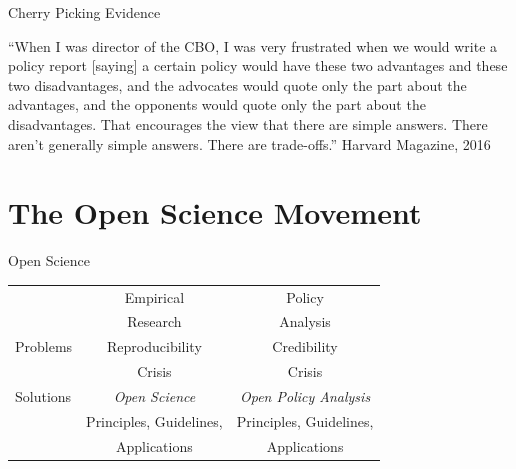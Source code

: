 \documentclass{beamer}
\def\white{\color{white}}
\begin{document}
\begin{frame}{Cherry Picking Evidence}
\pause
\begin{exampleblock}{}
  {\large ``When I was director of the CBO, I was very frustrated when we would write a policy report [saying] a certain policy would have these two advantages and these two disadvantages, and the advocates would quote only the part about the advantages, and the opponents would quote only the part about the disadvantages. That encourages the view that there are simple answers. There aren't generally simple answers. There are trade-offs.''
}
  \vskip3mm
   \footnotesize{ \linebreak  Harvard Magazine, 2016} 
  	  
\end{exampleblock}
\end{frame} 




\section[Solutions]{The Open Science Movement}

\begin{frame}{Open Science}
\begin{table}[ht]
\centering
\begin{tabular}[t]{|l|c|c|}
\hline
& Empirical  & Policy \\
& Research & Analysis \\

\hline
Problems & Reproducibility  &  Credibility \\
				 &  Crisis & Crisis \\
\hline
Solutions &  \textit{Open Science }&    {\white \textit{Open Policy Analysis } }\\
 & Principles, Guidelines,  &   {\white Principles, Guidelines,}\\
 & Applications &   {\white Applications}\\

\hline
\end{tabular}
\end{table}%
\end{frame}
\end{document}
